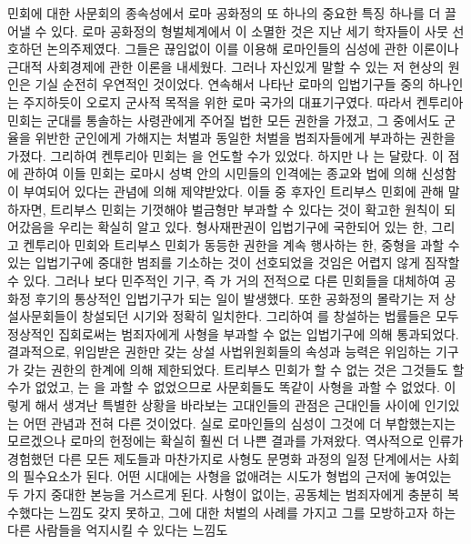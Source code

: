민회에 대한 사문회의 종속성에서
로마 공화정의 또 하나의 중요한 특징 하나를 더
끌어낼 수 있다.
로마 공화정의 형벌체계에서 이 소멸한 것은
지난 세기 학자들이 사뭇 선호하던 논의주제였다.
그들은 끊임없이 이를 이용해
로마인들의 심성에 관한 이론이나
근대적 사회경제에 관한 이론을 내세웠다.
그러나 자신있게 말할 수 있는 저 현상의 원인은
기실 순전히 우연적인 것이었다.
연속해서 나타난 로마의 입법기구들 중의 하나인
는 주지하듯이
오로지 군사적 목적을 위한 로마 국가의 대표기구였다.
따라서 켄투리아 민회는
군대를 통솔하는 사령관에게 주어질 법한 모든 권한을 가졌고,
그 중에서도
군율을 위반한 군인에게 가해지는 처벌과 동일한 처벌을 범죄자들에게
부과하는 권한을 가졌다.
그리하여 켄투리아 민회는 을 언도할 수가 있었다.
하지만 나
는 달랐다.
이 점에 관하여 이들 민회는
로마시 성벽 안의 시민들의 인격에는
종교와 법에 의해
신성함이 부여되어 있다는 관념에 의해 제약받았다.
이들 중 후자인 트리부스 민회에 관해 말하자면,
트리부스 민회는 기껏해야 벌금형만 부과할 수 있다는 것이
확고한 원칙이 되어갔음을 우리는 확실히 알고 있다.
형사재판권이 입법기구에 국한되어 있는 한,
그리고 켄투리아 민회와 트리부스 민회가
동등한 권한을 계속 행사하는 한,
중형을 과할 수 있는 입법기구에
중대한 범죄를
기소하는 것이
선호되었을 것임은 어렵지 않게 짐작할 수 있다.
그러나
보다 민주적인 기구, 즉 가
거의 전적으로 다른 민회들을 대체하여
공화정 후기의 통상적인 입법기구가 되는 일이 발생했다.
또한
공화정의 몰락기는
저 상설사문회들이 창설되던 시기와 정확히 일치한다.
그리하여
를 창설하는 법률들은 모두
정상적인 집회로써는
범죄자에게 사형을 부과할 수 없는 입법기구에 의해 통과되었다.
결과적으로,
위임받은 권한만 갖는
상설 사법위원회들의
속성과 능력은
위임하는 기구가 갖는 권한의 한계에 의해 제한되었다.
트리부스 민회가 할 수 없는 것은
그것들도 할 수가 없었고,
는 을 과할 수 없었으므로
사문회들도 똑같이 사형을 과할 수 없었다.
이렇게 해서 생겨난 특별한 상황을 바라보는
고대인들의 관점은
근대인들 사이에 인기있는 어떤 관념과 전혀 다른 것이었다.
실로
로마인들의 심성이 그것에 더 부합했는지는 모르겠으나
로마의 헌정에는 확실히 훨씬 더 나쁜 결과를 가져왔다.
역사적으로 인류가 경험했던 다른 모든 제도들과 마찬가지로
사형도 문명화 과정의 일정 단계에서는 사회의 필수요소가 된다.
어떤 시대에는
사형을 없애려는 시도가
형법의 근저에 놓여있는 두 가지 중대한 본능을 거스르게 된다.
사형이 없이는,
공동체는 범죄자에게 충분히 복수했다는 느낌도 갖지 못하고,
그에 대한 처벌의 사례를 가지고
그를 모방하고자 하는 다른 사람들을 억지시킬 수 있다는 느낌도
